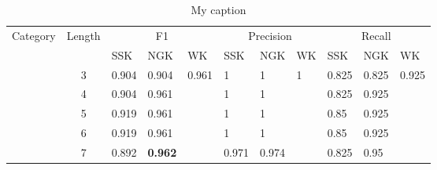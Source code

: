 \begin{table}[]
\centering
\caption{My caption}
\label{my-label}
\begin{tabular}{|c|c|l|l|l|l|l|l|l|l|l|}
\hline
Category               & Length                & \multicolumn{3}{c|}{F1}                                                                                         & \multicolumn{3}{c|}{Precision} & \multicolumn{3}{c|}{Recall}                                                                   \\ \cline{3-11} 
\multicolumn{1}{|l|}{} & \multicolumn{1}{l|}{} & SSK                                    & NGK                                    & WK                            & SSK      & NGK      & WK       & SSK                           & NGK                           & WK                            \\ \hline
                       & 3                     & \cellcolor[HTML]{EFEFEF}0.904          & \cellcolor[HTML]{EFEFEF}0.904          & \cellcolor[HTML]{EFEFEF}0.961 & 1        & 1        & 1        & \cellcolor[HTML]{EFEFEF}0.825 & \cellcolor[HTML]{EFEFEF}0.825 & \cellcolor[HTML]{EFEFEF}0.925 \\ \cline{2-11} 
                       & 4                     & \cellcolor[HTML]{EFEFEF}0.904          & \cellcolor[HTML]{EFEFEF}0.961          & \cellcolor[HTML]{EFEFEF}      & 1        & 1        &          & \cellcolor[HTML]{EFEFEF}0.825 & \cellcolor[HTML]{EFEFEF}0.925 & \cellcolor[HTML]{EFEFEF}      \\ \cline{2-11} 
                       & 5                     & \cellcolor[HTML]{EFEFEF}0.919          & \cellcolor[HTML]{EFEFEF}0.961          & \cellcolor[HTML]{EFEFEF}      & 1        & 1        &          & \cellcolor[HTML]{EFEFEF}0.85  & \cellcolor[HTML]{EFEFEF}0.925 & \cellcolor[HTML]{EFEFEF}      \\ \cline{2-11} 
                       & 6                     & \cellcolor[HTML]{EFEFEF}0.919          & \cellcolor[HTML]{EFEFEF}0.961          & \cellcolor[HTML]{EFEFEF}      & 1        & 1        &          & \cellcolor[HTML]{EFEFEF}0.85  & \cellcolor[HTML]{EFEFEF}0.925 & \cellcolor[HTML]{EFEFEF}      \\ \cline{2-11} 
                       & 7                     & \cellcolor[HTML]{EFEFEF}0.892          & \cellcolor[HTML]{EFEFEF}\textbf{0.962} & \cellcolor[HTML]{EFEFEF}      & 0.971    & 0.974    &          & \cellcolor[HTML]{EFEFEF}0.825 & \cellcolor[HTML]{EFEFEF}0.95  & \cellcolor[HTML]{EFEFEF}      \\ \cline{2-11} 

\end{tabular}
\end{table}
